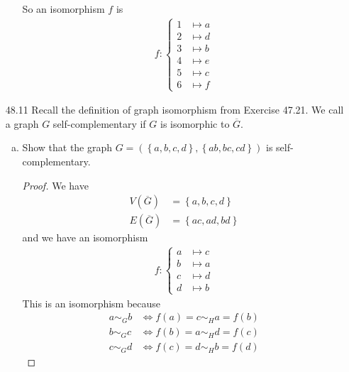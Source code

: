 \documentclass{article}
\begin{document}
\begin{itemize}
\begin{enumerate}[(a)]
\begin{soln}
\begin{center}
					\end{center}
					So an isomorphism $f$ is
					\begin{align*}
						f:\begin{cases}
							1 &\mapsto a \\
							2 &\mapsto d \\
							3 &\mapsto b \\
							4 &\mapsto e \\
							5 &\mapsto c \\
							6 &\mapsto f
						\end{cases}
					\end{align*}
				\end{soln}
		\end{enumerate}

	\item[48.11] Recall the definition of graph isomorphism from Exercise 47.21. We call a graph $G$ self-complementary if $G$ is isomorphic to $\overline{G}.$ 
		\begin{enumerate}[(a)]
			\item Show that the graph $G=(\left\{ a, b, c, d \right\}, \left\{ ab, bc, cd \right\})$ is self-complementary.
				\begin{proof}
					We have 
					\begin{align*}
						V(\overline{G})&=\left\{ a, b, c, d \right\} \\
						E(\overline{G}) &= \left\{ ac, ad, bd \right\}
					\end{align*}
					and we have an isomorphism
					\begin{align*}
						f:\begin{cases}
							a &\mapsto c \\
							b &\mapsto a \\
							c &\mapsto d \\
							d &\mapsto b
						\end{cases}
					\end{align*}
					This is an isomorphism because
					\begin{align*}
						a \sim_G b &\iff f(a)=c\sim_H a = f(b) \\
						b\sim_G c &\iff f(b)=a\sim_H d=f(c) \\
						c\sim_G d &\iff f(c)=d\sim_H b=f(d)
					\end{align*}
				\end{proof}


\end{enumerate}
\end{itemize}
\end{document}
